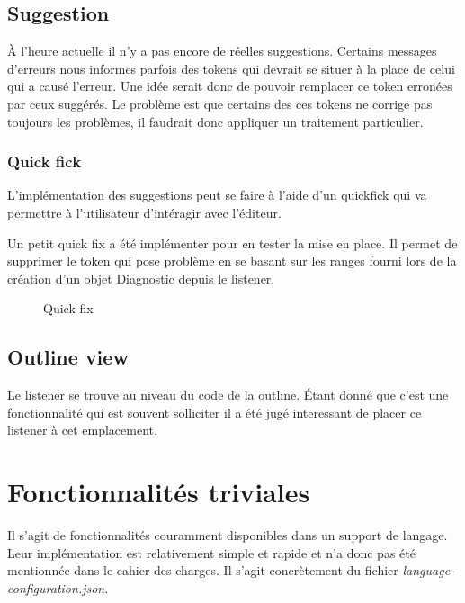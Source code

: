 \documentclass[
    iict, %
    il, %
]{heig-tb}
\begin{document}
\subsection{Suggestion}
À l'heure actuelle  il n'y a pas encore de réelles suggestions.
Certains messages d'erreurs nous informes parfois des tokens qui devrait se situer à la place de celui qui a causé l'erreur.
Une idée serait donc de pouvoir remplacer ce token erronées par ceux suggérés.
Le problème est que certains des ces tokens ne corrige pas toujours les problèmes, il faudrait donc appliquer un traitement particulier.

\subsubsection{Quick fick}

L'implémentation des suggestions peut se faire à l'aide d'un quickfick qui va permettre à l'utilisateur d'intéragir avec l'éditeur.

Un petit quick fix a été implémenter pour en tester la mise en place. Il permet de supprimer le token qui pose problème en se basant sur les ranges fourni lors de la création d'un objet Diagnostic depuis le listener.

\begin{figure}[!h]
    \begin{center}
    \end{center}
    \caption[Quick fix]{\label{quick-fix} Quick fix}
\end{figure}

\subsection{Outline view}
Le listener se trouve au niveau du code de la outline. Étant donné que c'est une fonctionnalité qui est souvent solliciter il a été jugé interessant
de placer ce listener à cet emplacement.

\section{Fonctionnalités triviales}
Il s'agit de fonctionnalités couramment disponibles dans un support de langage. Leur implémentation est relativement simple et rapide et n'a donc pas été mentionnée dans le cahier des charges.
Il s'agit concrètement du fichier \emph{language-configuration.json}. %
\end{document}
